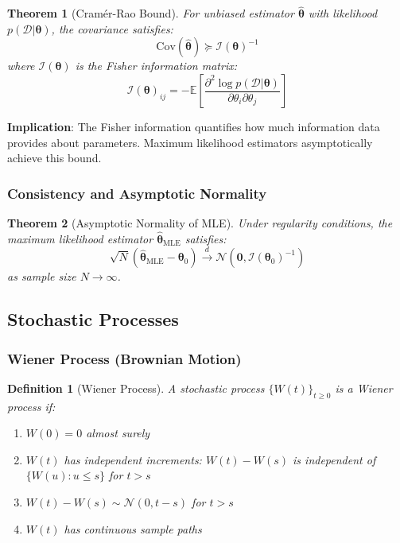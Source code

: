 \documentclass[11pt]{article}
\newtheorem{theorem}{Theorem}[section]
\newtheorem{definition}{Definition}[section]
\begin{document}
\begin{theorem}[Cramér-Rao Bound]
For unbiased estimator $\hat{\bm{\theta}}$ with likelihood $p(\mathcal{D}|\bm{\theta})$, the covariance satisfies:
\begin{equation}
\text{Cov}(\hat{\bm{\theta}}) \succeq \mathcal{I}(\bm{\theta})^{-1}
\end{equation}
where $\mathcal{I}(\bm{\theta})$ is the Fisher information matrix:
\begin{equation}
\mathcal{I}(\bm{\theta})_{ij} = -\mathbb{E}\left[\frac{\partial^2 \log p(\mathcal{D}|\bm{\theta})}{\partial \theta_i \partial \theta_j}\right]
\end{equation}
\end{theorem}

\textbf{Implication}: The Fisher information quantifies how much information data provides about parameters. Maximum likelihood estimators asymptotically achieve this bound.

\subsubsection{Consistency and Asymptotic Normality}

\begin{theorem}[Asymptotic Normality of MLE]
Under regularity conditions, the maximum likelihood estimator $\hat{\bm{\theta}}_{\text{MLE}}$ satisfies:
\begin{equation}
\sqrt{N}(\hat{\bm{\theta}}_{\text{MLE}} - \bm{\theta}_0) \xrightarrow{d} \mathcal{N}(\mathbf{0}, \mathcal{I}(\bm{\theta}_0)^{-1})
\end{equation}
as sample size $N \to \infty$.
\end{theorem}

\subsection{Stochastic Processes}

\subsubsection{Wiener Process (Brownian Motion)}

\begin{definition}[Wiener Process]
A stochastic process $\{W(t)\}_{t \geq 0}$ is a Wiener process if:
\begin{enumerate}
\item $W(0) = 0$ almost surely
\item $W(t)$ has independent increments: $W(t) - W(s)$ is independent of $\{W(u): u \leq s\}$ for $t > s$
\item $W(t) - W(s) \sim \mathcal{N}(0, t-s)$ for $t > s$
\item $W(t)$ has continuous sample paths
\end{enumerate}
\end{definition}
\end{document}
